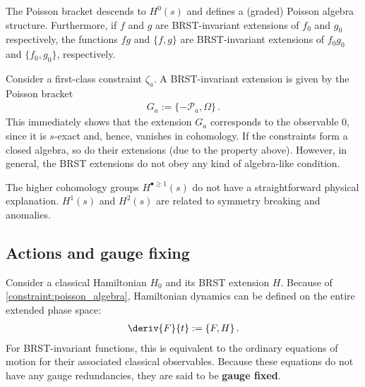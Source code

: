     \begin{property}\label{constraint:poisson_algebra}
        The Poisson bracket descends to $H^0(s)$ and defines a (graded) Poisson algebra structure. Furthermore, if $f$ and $g$ are BRST-invariant extensions of $f_0$ and $g_0$ respectively, the functions $fg$ and $\{f,g\}$ are BRST-invariant extensions of $f_0g_0$ and $\{f_0,g_0\}$, respectively.
    \end{property}

    \begin{example}
        Consider a first-class constraint $\zeta_a$. A BRST-invariant extension is given by the Poisson bracket
        \begin{gather}
            G_a := \{-\mathcal{P}_a,\Omega\}\,.
        \end{gather}
        This immediately shows that the extension $G_a$ corresponds to the observable 0, since it is $s$-exact and, hence, vanishes in cohomology. If the constraints form a closed algebra, so do their extensions (due to the property above). However, in general, the BRST extensions do not obey any kind of algebra-like condition.
    \end{example}

    \begin{remark}
        The higher cohomology groups $H^{\bullet\geq1}(s)$ do not have a straightforward physical explanation. $H^1(s)$ and $H^2(s)$ are related to symmetry breaking and anomalies.
    \end{remark}

\subsection{Actions and gauge fixing}

    Consider a classical Hamiltonian $H_0$ and its BRST extension $H$. Because of \cref{constraint:poisson_algebra}, Hamiltonian dynamics can be defined on the entire extended phase space:
    \begin{gather}
        \deriv{F}{t} := \{F,H\}\,.
    \end{gather}
    For BRST-invariant functions, this is equivalent to the ordinary equations of motion for their associated classical observables. Because these equations do not have any gauge redundancies, they are said to be \textbf{gauge fixed}.

